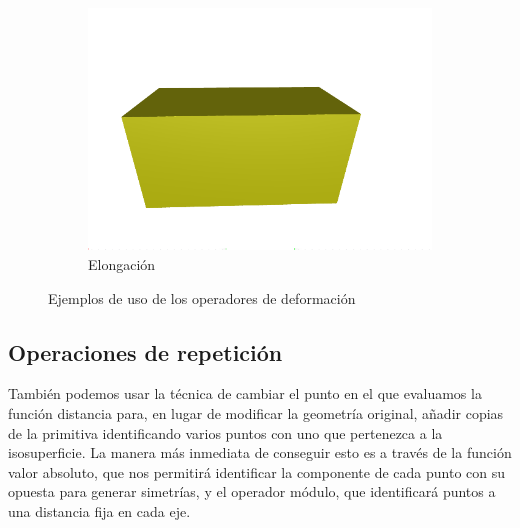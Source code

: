 \begin{figure}[ht!]
\begin{subfigure}[b]{0.30\textwidth}
        \includegraphics[width=\textwidth]{Plantilla-TFG-master/img/deform_elong.png}
        \caption{Elongación}
    \end{subfigure}
    
    \caption{Ejemplos de uso de los operadores de deformación}
\end{figure}

\subsection{Operaciones de repetición}
También podemos usar la técnica de cambiar el punto en el que evaluamos la función distancia para, en lugar de modificar la geometría original, añadir copias de la primitiva identificando varios puntos con uno que pertenezca a la isosuperficie. La manera más inmediata de conseguir esto es a través de la función valor absoluto, que nos permitirá identificar la componente de cada punto con su opuesta para generar simetrías, y el operador módulo, que identificará puntos a una distancia fija en cada eje.

